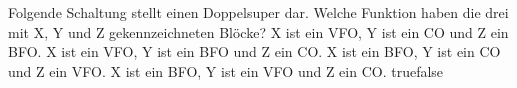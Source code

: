     {Folgende Schaltung stellt einen Doppelsuper dar. Welche Funktion haben die drei mit X, Y und Z gekennzeichneten Blöcke?}
    {X ist ein VFO, Y ist ein CO und Z ein BFO.}
    {X ist ein VFO, Y ist ein BFO und Z ein CO.}
    {X ist ein BFO, Y ist ein CO und Z ein VFO.}
    {X ist ein BFO, Y ist ein VFO und Z ein CO.}
    {true}{false}